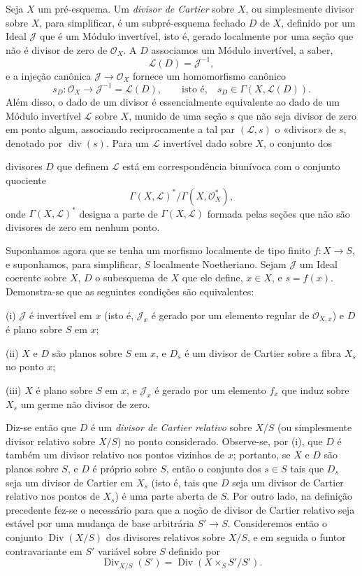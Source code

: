 \documentclass[11pt,twoside,openany]{book}
\numberwithin{equation}{section}
\newcommand{\src}[1]{%
  \phantomsection\hypertarget{src:#1}{}%
  \marginpar{\raggedleft\footnotesize\sffamily #1}%
}
\theoremstyle{plain}
\theoremstyle{definition}
\theoremstyle{remark}
\newcommand{\FgaUnitKey}{frontmatter}
\renewcommand{\src}[1]{%
  \phantomsection\hypertarget{src:\FgaUnitKey:#1}{}%
  \marginpar{\raggedleft\footnotesize\sffamily #1}%
}
\begin{document}
Seja $X$ um pré-esquema. Um \emph{divisor de Cartier} sobre $X$, ou simplesmente
divisor sobre $X$, para simplificar, é um subpré-esquema fechado $D$ de $X$,
definido por um Ideal $\mathcal J$ que é um Módulo invertível, isto é, gerado
localmente por uma seção que não é divisor de zero de $\mathcal O_X$. A $D$
associamos um Módulo invertível, a saber,
\[
\mathcal L(D)=\mathcal J^{-1},
\]
e a injeção canônica $\mathcal J\longrightarrow\mathcal O_X$ fornece um
homomorfismo canônico
\[
s_D:\mathcal O_X\longrightarrow\mathcal J^{-1}=\mathcal L(D),
\qquad\text{isto é,}\quad s_D\in\Gamma(X,\mathcal L(D)).
\]
Além disso, o dado de um divisor é essencialmente equivalente ao dado de um
Módulo invertível $\mathcal L$ sobre $X$, munido de uma seção $s$ que não seja
divisor de zero em ponto algum, associando reciprocamente a tal par
$(\mathcal L,s)$ o «divisor» de $s$, denotado por $\operatorname{div}(s)$. Para
um $\mathcal L$ invertível dado sobre $X$, o conjunto dos
\src{151}
divisores $D$ que definem $\mathcal L$ está em correspondência biunívoca com o
conjunto quociente
\[
\Gamma(X,\mathcal L)^*/\Gamma(X,\mathcal O_X^*),
\]
onde $\Gamma(X,\mathcal L)^*$ designa a parte de $\Gamma(X,\mathcal L)$ formada
pelas seções que não são divisores de zero em nenhum ponto.

Suponhamos agora que se tenha um morfismo localmente de tipo finito
$f:X\longrightarrow S$, e suponhamos, para simplificar, $S$ localmente
Noetheriano. Sejam $\mathcal J$ um Ideal coerente sobre $X$, $D$ o subesquema de
$X$ que ele define, $x\in X$, e $s=f(x)$. Demonstra-se que as seguintes
condições são equivalentes:

\noindent (i) $\mathcal J$ é invertível em $x$ (isto é, $\mathcal J_x$ é gerado
por um elemento regular de $\mathcal O_{X,x}$) e $D$ é plano sobre $S$ em $x$;

\noindent (ii) $X$ e $D$ são planos sobre $S$ em $x$, e $D_s$ é um divisor de
Cartier sobre a fibra $X_s$ no ponto $x$;

\noindent (iii) $X$ é plano sobre $S$ em $x$, e $\mathcal J_x$ é gerado por um
elemento $f_x$ que induz sobre $X_s$ um germe não divisor de zero.

Diz-se então que $D$ é um \emph{divisor de Cartier relativo} sobre $X/S$ (ou
simplesmente divisor relativo sobre $X/S$) no ponto considerado. Observe-se, por
(i), que $D$ é também um divisor relativo nos pontos vizinhos de $x$; portanto,
se $X$ e $D$ são planos sobre $S$, e $D$ é próprio sobre $S$, então o conjunto
dos $s\in S$ tais que $D_s$ seja um divisor de Cartier em $X_s$ (isto é, tais
que $D$ seja um divisor de Cartier relativo nos pontos de $X_s$) é uma parte
aberta de $S$. Por outro lado, na definição precedente fez-se o necessário para
que a noção de divisor de Cartier relativo seja estável por uma mudança de base
arbitrária $S'\longrightarrow S$. Consideremos então o conjunto
$\operatorname{Div}(X/S)$ dos divisores relativos sobre $X/S$, e em seguida o
funtor contravariante em $S'$ variável sobre $S$ definido por
\[
\operatorname{Div}_{X/S}(S')=
\operatorname{Div}(X\times_SS'/S').
\]
\end{document}
